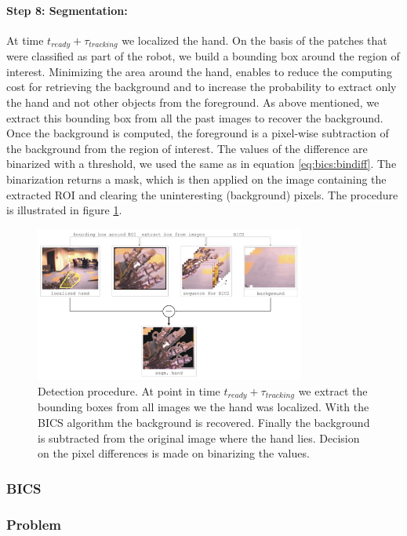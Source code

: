 \documentclass[conference]{IEEEtran}
\begin{document}
\paragraph{Step 8: Segmentation:}
\label{halose:se8}
% 
At time $t_{ready}+ \tau_{tracking}$ we localized the hand. On the basis of the patches that were classified as part of the robot, we build a bounding box around the region of interest. Minimizing the area around the hand, enables to reduce the computing cost for retrieving the background and to increase the probability to extract only the hand and not other objects from the foreground. As above mentioned, we extract this bounding box from all the past images to recover the background. Once the background is computed, the foreground is a pixel-wise subtraction of the background from the region of interest. The values of the difference are binarized with a threshold, we used the same as in equation \ref{eq:bics:bindiff}. The binarization returns a mask, which is then applied on the image containing the extracted ROI and clearing the uninteresting (background) pixels. The procedure is illustrated in figure \ref{fig:segmentation}.
%
\begin{figure}[ht]
	\begin{center}
		\includegraphics[width=3.5in]{imgs/method/segmentation.pdf}
	\end{center}
		\caption[Detection procedure. ]{Detection procedure. At point in time $t_{ready}+ \tau_{tracking}$ we extract the bounding boxes from all images we the hand was localized. With the BICS algorithm the background is recovered. Finally the background is subtracted from the original image where the hand lies. Decision on the pixel differences is made on binarizing the values.}
		\label{fig:segmentation}
\end{figure}
%
\subsubsection{BICS}
\subsubsection{Problem}
\end{document}
